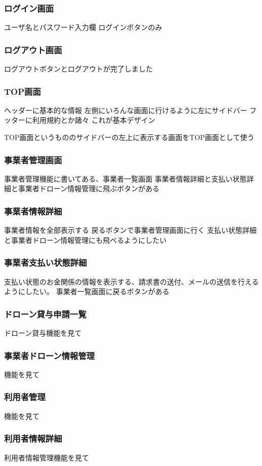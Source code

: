 \documentclass[a4paper, titlepage]{jsarticle}
\begin{document}
\subsubsection{ログイン画面}
ユーザ名とパスワード入力欄
ログインボタンのみ
\subsubsection{ログアウト画面}
ログアウトボタンとログアウトが完了しました
\subsubsection{TOP画面}
ヘッダーに基本的な情報
左側にいろんな画面に行けるように左にサイドバー
フッターに利用規約とか諸々
これが基本デザイン

TOP画面というもののサイドバーの左上に表示する画面をTOP画面として使う
\subsubsection{事業者管理画面}
事業者管理機能に書いてある、事業者一覧画面
事業者情報詳細と支払い状態詳細と事業者ドローン情報管理に飛ぶボタンがある

\subsubsection{事業者情報詳細}
事業者情報を全部表示する
戻るボタンで事業者管理画面に行く
支払い状態詳細と事業者ドローン情報管理にも飛べるようにしたい

\subsubsection{事業者支払い状態詳細}
支払い状態のお金関係の情報を表示する、請求書の送付、メールの送信を行えるようにしたい。
事業者一覧画面に戻るボタンがある

\subsubsection{ドローン貸与申請一覧}
ドローン貸与機能を見て
\subsubsection{事業者ドローン情報管理}
機能を見て
\subsubsection{利用者管理}
機能を見て
\subsubsection{利用者情報詳細}
利用者情報管理機能を見て
\end{document}
